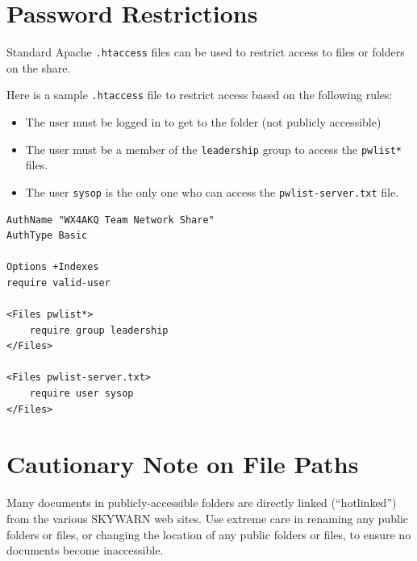 \documentclass[pdflatex,letterpaper,twoside,12pt]{book}
\begin{document}
\section{Password Restrictions}

Standard Apache \texttt{.htaccess} files can be used to restrict access to files or folders on the share.

Here is a sample \texttt{.htaccess} file to restrict access based on the following rules:

\begin{itemize}
\item The user must be logged in to get to the folder (not publicly accessible)
\item The user must be a member of the \texttt{leadership} group to access the \texttt{pwlist*} files.
\item The user \texttt{sysop} is the only one who can access the \texttt{pwlist-server.txt} file.
\end{itemize}

\begin{verbatim}
AuthName "WX4AKQ Team Network Share"
AuthType Basic

Options +Indexes
require valid-user

<Files pwlist*>
	require group leadership
</Files>

<Files pwlist-server.txt>
	require user sysop
</Files>
\end{verbatim}



\section{Cautionary Note on File Paths}

Many documents in publicly-accessible folders are directly linked (``hotlinked'') from the various SKYWARN web sites.  Use extreme care in renaming any public folders or files, or changing the location of any public folders or files, to ensure no documents become inaccessible.

\end{document}
